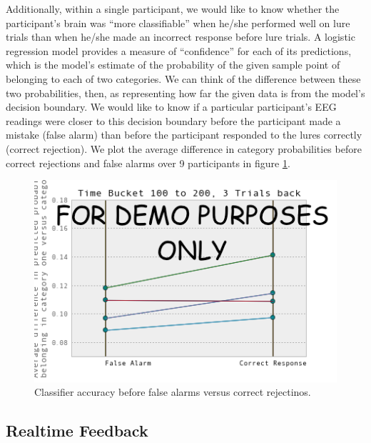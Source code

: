 \documentclass[11pt]{report}
\begin{document}
Additionally, within a single participant, we would like to know whether the participant's brain was ``more classifiable'' when he/she performed well on lure trials than when he/she made an incorrect response before lure trials.  A logistic regression model provides a measure of ``confidence'' for each of its predictions, which is the model's estimate of the probability of the given sample point of belonging to each of two categories.  We can think of the difference between these two probabilities, then, as representing how far the given data is from the model's decision boundary.  We would like to know if a particular participant's EEG readings were closer to this decision boundary before the participant made a mistake (false alarm) than before the participant responded to the lures correctly (correct rejection).  We plot the average difference in category probabilities before correct rejections and false alarms over 9 participants in figure \ref{falsealarmcorrectreject}.

\begin{figure}[t]
\centering
\includegraphics[width=5in]{falsealarm_versus_correctreject}
\caption{Classifier accuracy before false alarms versus correct rejectinos.\label{falsealarmcorrectreject}}
\end{figure}

\subsection{Realtime Feedback}
\end{document}
